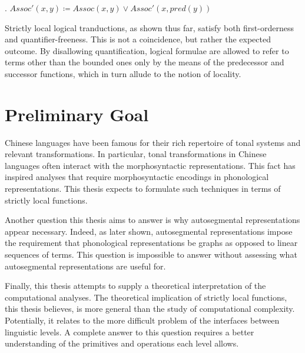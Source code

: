\documentclass[12pt, a4paper]{report}
\begin{document}
\ex. \(\mathit{Assoc}'(x, y) \coloneq \mathit{Assoc}(x, y) \lor
\mathit{Assoc}'(x, \mathit{pred}(y))\)


Strictly local logical tranductions, as shown thus far, satisfy both
first-orderness and quantifier-freeness.  This is not a coincidence,
but rather the expected outcome.  By disallowing quantification,
logical formulae are allowed to refer to terms other than the bounded
ones only by the means of the predecessor and successor functions,
which in turn allude to the notion of locality.

\section{Preliminary Goal}
Chinese languages have been famous for their rich repertoire of tonal
systems and relevant transformations.  In particular, tonal
transformations in Chinese languages often interact with the
morphosyntactic representations.  This fact has inspired analyses that
require morphosyntactic encodings in phonological representations.
This thesis expects to formulate such techniques in terms of strictly
local functions.

Another question this thesis aims to answer is why autosegmental
representations appear necessary.  Indeed, as later shown,
autosegmental representations impose the requirement that phonological
representations be graphs as opposed to linear sequences of terms.
This question is impossible to answer without assessing what
autosegmental representations are useful for.

Finally, this thesis attempts to supply a theoretical interpretation
of the computational analyses.  The theoretical implication of
strictly local functions, this thesis believes, is more general than
the study of computational complexity.  Potentially, it relates to the
more difficult problem of the interfaces between linguistic levels.  A
complete answer to this question requires a better understanding of
the primitives and operations each level allows.

\printbibliography[heading=bibintoc]

\printindex
\end{document}
